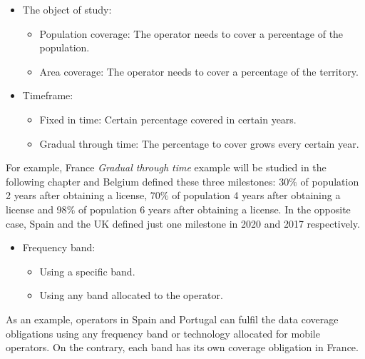 \begin{itemize}
	\item The object of study:\par

\begin{itemize}
	\item Population coverage: The operator needs to cover a percentage of the population.\par

	\item Area coverage: The operator needs to cover a percentage of the territory.\par

\end{itemize}
\end{itemize}
\begin{itemize}
	\item Timeframe:\par

\begin{itemize}
	\item Fixed in time: Certain percentage covered in certain years.\par

	\item Gradual through time: The percentage to cover grows every certain year.\par
\end{itemize}
\end{itemize}
For example, France \guillemotleft \textit{Gradual through time\guillemotright } example will be studied in the following chapter and Belgium defined these three milestones: 30$\%$  of population 2 years after obtaining a license, 70$\%$  of population 4 years after obtaining a license and 98$\%$  of population 6 years after obtaining a license. In the opposite case, Spain and the UK defined just one milestone in 2020 and 2017 respectively.\par

\begin{itemize}
	\item Frequency band:\par

\begin{itemize}
	\item Using a specific band.\par

	\item Using any band allocated to the operator.\par

\end{itemize}
\end{itemize}
As an example, operators in Spain and Portugal can fulfil the data coverage obligations using any frequency band or technology allocated for mobile operators. On the contrary, each band has its own coverage obligation in France.\par


